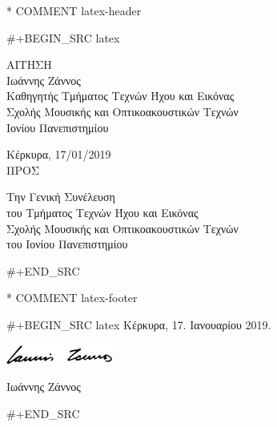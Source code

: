 * COMMENT latex-header

#+BEGIN_SRC latex
\usepackage{fontspec}
\setmainfont{Linux Libertine O} %
\usepackage[a4paper,width=170mm,top=15mm,bottom=25mm]{geometry}
\usepackage{hyperref} %
\usepackage{ulem} %
\usepackage{multicol}
\usepackage{graphicx} %
\raggedcolumns

\begin{multicols}{2}
\noindent
\vspace{0.5cm}
ΑΙΤΗΣΗ\\
\noindent
Ιωάννης Ζάννος\\
Καθηγητής Τμήματος Τεχνών Ήχου και Εικόνας\\
Σχολής Μουσικής και Οπτικοακουστικών Τεχνών\\
Ιονίου Πανεπιστημίου

\vspace*{0.5cm}
\noindent
Κέρκυρα, 17/01/2019\\


\columnbreak
\noindent
ΠΡΟΣ

\vspace{0.5cm}
\noindent
Την Γενική Συνέλευση\\
του Τμήματος Τεχνών Ήχου και Εικόνας\\
Σχολής Μουσικής και Οπτικοακουστικών Τεχνών\\
του Ιονίου Πανεπιστημίου

\vspace{1cm}

#+END_SRC

* COMMENT latex-footer

#+BEGIN_SRC latex
\vspace{1cm}
\parindent=0.5cm
Κέρκυρα,  17. Ιανουαρίου 2019.

\vspace{0.5cm}

\includegraphics[width=3.5cm]{signature}

\vspace{0.5cm}
\parindent=1cm
Ιωάννης Ζάννος

\end{multicols}

#+END_SRC

